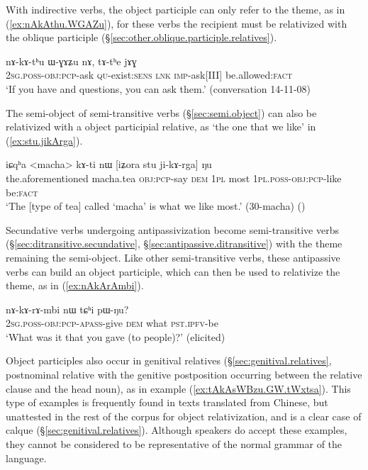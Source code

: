 With indirective verbs, the object participle can only refer to the theme, as in (\ref{ex:nAkAthu.WGAZu}), for these verbs the recipient must be relativized with the oblique participle  (§\ref{sec:other.oblique.participle.relatives}).

\begin{exe}
\ex \label{ex:nAkAthu.WGAZu}
\gll nɤ-kɤ-tʰu ɯ-ɣɤʑu nɤ, tɤ-tʰe jɤɣ \\
\textsc{2sg}.\textsc{poss}-\textsc{obj}:\textsc{pcp}-ask \textsc{qu}-exist:\textsc{sens} \textsc{lnk} \textsc{imp}-ask[III] be.allowed:\textsc{fact} \\
\glt `If you have and questions, you can ask them.' (conversation 14-11-08)
\end{exe}

The semi-object of semi-transitive verbs (§\ref{sec:semi.object}) can also be relativized with a object participial relative, as  `the one that we like' in (\ref{ex:stu.jikArga}).

\begin{exe}
\ex \label{ex:stu.jikArga}
\gll  iɕqʰa <macha> kɤ-ti nɯ [iʑora stu ji-kɤ-rga] ŋu \\
the.aforementioned macha.tea \textsc{obj}:\textsc{pcp}-say \textsc{dem} \textsc{1pl} most \textsc{1pl}.\textsc{poss}-\textsc{obj}:\textsc{pcp}-like be:\textsc{fact} \\
\glt `The [type of tea] called `macha' is what we like most.' (30-macha)
()
\end{exe}

Secundative verbs undergoing antipassivization become semi-transitive verbs (§\ref{sec:ditransitive.secundative}, §\ref{sec:antipassive.ditransitive}) with the theme remaining the semi-object. Like other semi-transitive verbs, these antipassive verbs can build an object participle, which can then be used to relativize the theme, as in (\ref{ex:nAkArAmbi}).

\begin{exe}
\ex \label{ex:nAkArAmbi}
\gll  nɤ-kɤ-rɤ-mbi nɯ tɕʰi pɯ-ŋu? \\
\textsc{2sg}.\textsc{poss}-\textsc{obj}:\textsc{pcp}-\textsc{apass}-give \textsc{dem} what \textsc{pst}.\textsc{ipfv}-be \\
\glt `What was it that you gave (to people)?' (elicited)
\end{exe}

Object participles also occur in genitival relatives (§\ref{sec:genitival.relatives}, postnominal relative with the genitive postposition  occurring between the relative clause and the head noun), as in example (\ref{ex:tAkAsWBzu.GW.tWxtsa}). This type of examples is frequently found in texts translated from Chinese, but unattested in the rest of the corpus for object relativization, and is a clear case of calque (§\ref{sec:genitival.relatives}). Although speakers do accept these examples, they cannot be considered to be representative of the normal grammar of the language.

